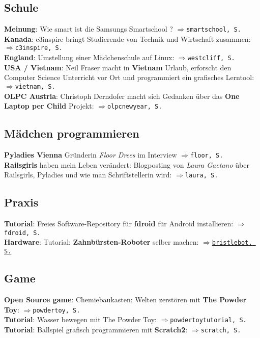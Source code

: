 \subsection*{Schule}

\textbf{Meinung}: Wie smart ist die Samsungs Smartschool ? $\Rightarrow$\texttt{smartschool, S. \pageref{smartschool}}\\
\textbf{Kanada}: c3inspire bringt Studierende von Technik und Wirtschaft zusammen: $\Rightarrow$\texttt{c3inspire, S. \pageref{c3inspire}}\\
\textbf{England}: Umstellung einer Mädchenschule auf Linux: $\Rightarrow$\texttt{westcliff, S. \pageref{westcliff}}\\
\textbf{USA / Vietnam}: Neil Fraser macht in \textbf{Vietnam} Urlaub, erforscht den Computer Science Unterricht vor Ort und programmiert ein grafisches Lerntool: $\Rightarrow$\texttt{vietnam, S. \pageref{vietnam}}\\ 
\textbf{OLPC Austria}: Christoph Derndofer macht sich Gedanken über das \textbf{One Laptop per Child} Projekt: $\Rightarrow$\texttt{olpcnewyear, S. \pageref{olpcnewyear}}\\

\subsection*{Mädchen programmieren}

\textbf{Pyladies Vienna} Gründerin \textit{Floor Drees} im Interview $\Rightarrow$\texttt{floor, S. \pageref{floor}}\\
\textbf{Railsgirls} haben mein Leben verändert: Blogposting von \textit{Laura Gaetano} über Railsgirls, Pyladies und wie man Schriftstellerin wird: $\Rightarrow$\texttt{laura, S.\pageref{laura}}\\

\subsection*{Praxis}

\textbf{Tutorial}: Freies Software-Repository für \textbf{fdroid} für Android installieren: $\Rightarrow$\texttt{fdroid, S. \pageref{fdroid}}\\ \textbf{Hardware}: Tutorial: \textbf{Zahnbürsten-Roboter} selber machen: \hyperlink{bristlebot}{\texttt{$\Rightarrow$bristlebot, S.}} \pageref{bristlebot}\\

\subsection*{Game}

\textbf{Open Source game}: Chemiebaukasten: Welten zerstören mit \textbf{The Powder Toy}: $\Rightarrow$\texttt{powdertoy, S. \pageref{powdertoy}}\\
\textbf{Tutorial}: Wasser bewegen mit The Powder Toy: $\Rightarrow$\texttt{powdertoytutorial, S. \pageref{powdertoytutorial}}\\
\textbf{Tutorial}: Ballspiel grafisch programmieren mit \textbf{Scratch2}: $\Rightarrow$\texttt{scratch, S. \pageref{scratch}}\\


